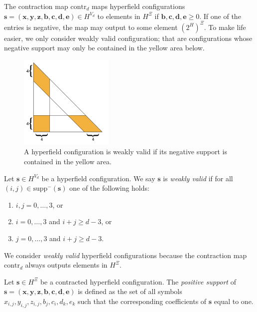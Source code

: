 The contraction map \( \mathrm{contr}_d \) maps hyperfield configurations \( \mathbf{s} = (\mathbf{x}, \mathbf{y}, \mathbf{z}, \mathbf{b}, \mathbf{c}, \mathbf{d}, \mathbf{e}) \in H^{{V_d}} \) to elements in \( H^{\Xi} \) if \( \mathbf{b}, \mathbf{c}, \mathbf{d}, \mathbf{e}  \geq 0\). If one of the entries is negative, the map may output to some element \( (2^H)^{\Xi} \). To make life easier, we only consider weakly valid configuration; that are configurations whose negative support may only be contained in the yellow area below.

\begin{figure}[H]
    \centering
    \includegraphics[width=0.4\textwidth]{assets/weakly-valid.png}
    \caption{A hyperfield configuration is weakly valid if its negative support is contained in the yellow area.}
\end{figure}

\begin{definition}
    Let \( \mathbf{s} \in H^{V_d} \) be a hyperfield configuration. We say \( \mathbf{s} \) is \emph{weakly valid} if for all \( (i,j) \in \mathrm{supp}^-(\mathbf{s}) \) one of the following holds:
    \begin{enumerate}
        \item \( i,j = 0, \dots, 3 \), or
        \item \( i = 0, \dots, 3 \) and \( i+j \geq d-3 \), or
        \item \( j = 0, \dots, 3 \) and \( i + j \geq d-3 \).
    \end{enumerate}
\end{definition}

We consider \emph{weakly valid} hyperfield configurations because the contraction map \( \mathrm{contr}_d \) always outputs elements in \( H^{\Xi} \).

\begin{definition}
    Let \( \mathbf{s} \in H^{\Xi} \) be a contracted hyperfield configuration. The \emph{positive support} of \( \mathbf{s} = (\mathbf{x}, \mathbf{y}, \mathbf{z}, \mathbf{b}, \mathbf{c}, \mathbf{d}, \mathbf{e}) \) is defined as the set of all symbols \( x_{i,j}, y_{i,j}, z_{i,j}, b_j, c_i, d_k, e_k \) such that the corresponding coefficients of \( \mathbf{s} \) equal to one.
\end{definition}

